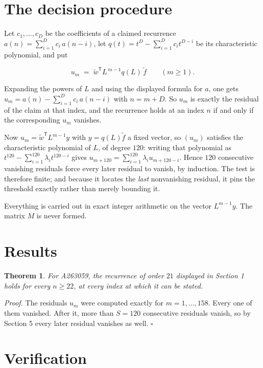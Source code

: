 \documentclass[11pt]{article}
\newtheorem{theorem}{Theorem}
\theoremstyle{definition}
\begin{document}
\section{The decision procedure}

Let $c_1,\dots,c_D$ be the coefficients of a claimed recurrence $a(n) = \sum_{i=1}^{D} c_i\,a(n-i)$, let $q(t) = t^{D} - \sum_{i=1}^{D} c_i t^{D-i}$ be its characteristic polynomial, and put

\[u_m \;=\; \tilde w^{\mathsf T} L^{\,m-1} q(L)\,\tilde f \qquad (m \ge 1).\]

Expanding the powers of $L$ and using the displayed formula for $a$, one gets $u_m = a(n) - \sum_{i=1}^{D} c_i\,a(n-i)$ with $n = m + D$. So $u_m$ is exactly the residual of the claim at that index, and the recurrence holds at an index $n$ if and only if the corresponding $u_m$ vanishes.

Now $u_m = \tilde w^{\mathsf T} L^{m-1} y$ with $y = q(L)\tilde f$ a fixed vector, so $(u_m)$ satisfies the characteristic polynomial of $L$, of degree $120$: writing that polynomial as $t^{120} - \sum_{i=1}^{120} \lambda_i t^{120-i}$ gives $u_{m+120} = \sum_{i=1}^{120} \lambda_i u_{m+120-i}$. Hence $120$ consecutive vanishing residuals force every later residual to vanish, by induction. The test is therefore finite; and because it locates the {\itshape last} nonvanishing residual, it pins the threshold exactly rather than merely bounding it.

Everything is carried out in exact integer arithmetic on the vector $L^{m-1}y$. The matrix $M$ is never formed.

\section{Results}

\begin{theorem} For A263059, the recurrence of order $21$ displayed in Section 1 holds for every $n \ge 22$, at every index at which it can be stated.\end{theorem}

{\itshape Proof.} The residuals $u_m$ were computed exactly for $m = 1,\dots,158$. Every one of them vanished. After it, more than $S = 120$ consecutive residuals vanish, so by Section 5 every later residual vanishes as well. $\square$

\section{Verification}
\end{document}
